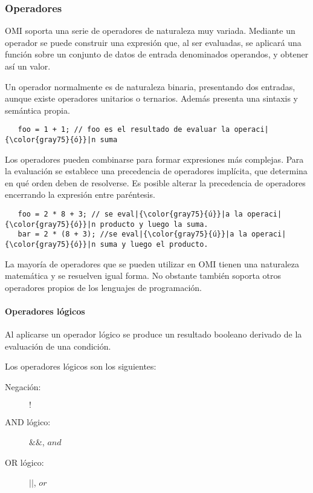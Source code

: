 \subsubsection{Operadores}
OMI soporta una serie de operadores de naturaleza muy variada. Mediante un operador se puede construir una expresión que, al ser evaluadas, se aplicará una función
sobre un conjunto de datos de entrada denominados operandos, y obtener así un valor.

Un operador normalmente es de naturaleza binaria, presentando dos entradas, aunque existe operadores unitarios o ternarios. Además presenta una sintaxis y semántica propia. \\

\begin{lstlisting}
   foo = 1 + 1; // foo es el resultado de evaluar la operaci|{\color{gray75}{ó}}|n suma
\end{lstlisting} 

Los operadores pueden combinarse para formar expresiones más complejas. Para la evaluación se establece una precedencia de operadores implícita, que determina en qué orden 
deben de resolverse. Es posible alterar la precedencia de operadores encerrando la expresión entre paréntesis. \\

\begin{lstlisting}
   foo = 2 * 8 + 3; // se eval|{\color{gray75}{ú}}|a la operaci|{\color{gray75}{ó}}|n producto y luego la suma.
   bar = 2 * (8 + 3); //se eval|{\color{gray75}{ú}}|a la operaci|{\color{gray75}{ó}}|n suma y luego el producto.
\end{lstlisting} 

La mayoría de operadores que se pueden utilizar en OMI tienen una naturaleza matemática y se resuelven igual forma. No obstante también soporta otros operadores propios de
los lenguajes de programación. 

\paragraph{Operadores lógicos}\label{sec:op_bool}

Al aplicarse un operador lógico se produce un resultado booleano derivado de la evaluación de una condición. 

Los operadores lógicos son los siguientes:

\begin{description}
\item [Negación:] $!$
\item [AND lógico:] $\&\&$, $and$
\item [OR lógico:] $||$, $or$
\end{description} 


